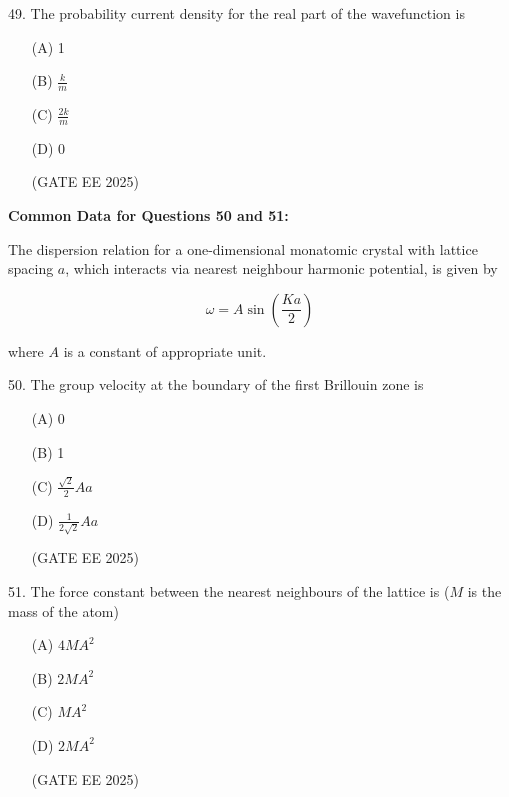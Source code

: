 \documentclass[twocolumn]{article}
\begin{document}
49. The probability current density for the real part of the wavefunction is

\begin{itemize}
\item[(A)] 1

\item[(B)] $\frac{k}{m}$

\item[(C)] $\frac{2k}{m}$

\item[(D)] 0

(GATE EE 2025)
  \end{itemize}




\noindent
\textbf{Common Data for Questions 50 and 51:}

The dispersion relation for a one-dimensional monatomic crystal with lattice spacing $a$, which interacts via nearest neighbour harmonic potential, is given by

\[
\omega = A \sin \left( \frac{Ka}{2} \right)
\]

where $A$ is a constant of appropriate unit.




50. The group velocity at the boundary of the first Brillouin zone is

\begin{itemize}
\item[(A)] 0

\item[(B)] 1

\item[(C)] $\frac{\sqrt{2}}{2} Aa$

\item[(D)] $\frac{1}{2\sqrt{2}} Aa$

(GATE EE 2025)
  \end{itemize}




51. The force constant between the nearest neighbours of the lattice is ($M$ is the mass of the atom)

\begin{itemize}
\item[(A)] $4 M A^2$

\item[(B)] $2 M A^2$

\item[(C)] $M A^2$

\item[(D)] $2 M A^2$

(GATE EE 2025)
  \end{itemize}
\end{document}
